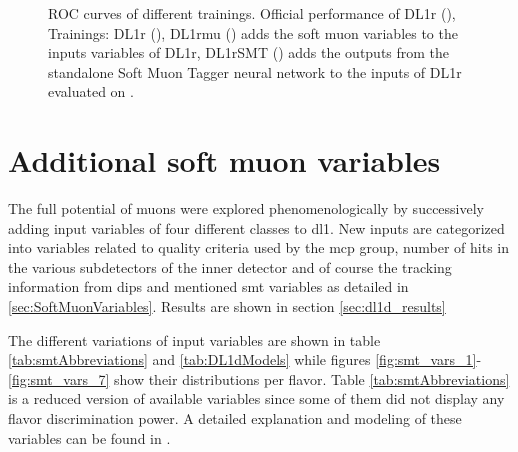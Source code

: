 \begin{figure}[]
  \centering
  \caption{ROC curves of different trainings. Official performance of DL1r (), Trainings: DL1r (), DL1rmu () adds the soft muon variables to the inputs variables of DL1r,  DL1rSMT () adds the outputs from the standalone Soft Muon Tagger neural network to the inputs of DL1r evaluated on \Zprime. }
  \label{fig:DL1rmu_vs_DL1r_SMT_z}
\end{figure}



\section{Additional soft muon variables}
The full potential of muons were explored phenomenologically by successively adding input variables of four different classes to \ac{dl1}. New inputs are categorized into variables related to quality criteria used by the \ac{mcp} group, number of hits in the various subdetectors of the inner detector and of course the tracking information from \ac{dips} and mentioned \ac{smt} variables as detailed in \ref{sec:SoftMuonVariables}. Results are shown in section \ref{sec:dl1d_results}

The different variations of input variables are shown in table \ref{tab:smtAbbreviations} and \ref{tab:DL1dModels} while figures \ref{fig:smt_vars_1}-\ref{fig:smt_vars_7} show their distributions per flavor. Table \ref{tab:smtAbbreviations} is a reduced version of available variables since some of them did not display any flavor discrimination power. A detailed explanation and modeling of these variables can be found in \citep{Assamagan:1099953,Bugge:2665711}.

